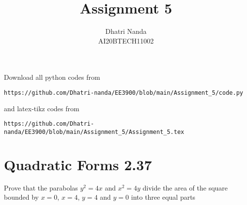\documentclass[journal,12pt,twocolumn]{IEEEtran}
\begin{document}
     \def\centbox#1{\makebox[0in]{#1}}
     \def\topbox#1{\raisebox{-\baselineskip}[0in][0in]{#1}}
     \def\midbox#1{\raisebox{-0.5\baselineskip}[0in][0in]{#1}}
\vspace{3cm}
\title{Assignment 5}
\author{Dhatri Nanda \\ AI20BTECH11002}
\maketitle
\newpage
\bigskip
\renewcommand{\thefigure}{\theenumi}
\renewcommand{\thetable}{\theenumi}
Download all python codes from 
\begin{lstlisting}
https://github.com/Dhatri-nanda/EE3900/blob/main/Assignment_5/code.py
\end{lstlisting}
%
and latex-tikz codes from 
%
\begin{lstlisting}
https://github.com/Dhatri-nanda/EE3900/blob/main/Assignment_5/Assignment_5.tex
\end{lstlisting}
\section{Quadratic Forms 2.37}
Prove that the parabolas $y^2 = 4x$ and $x^2 = 4y$ divide the area of the square bounded by $x=0$, $x=4$, $y=4$ and $y=0$ into three equal parts
\end{document}
